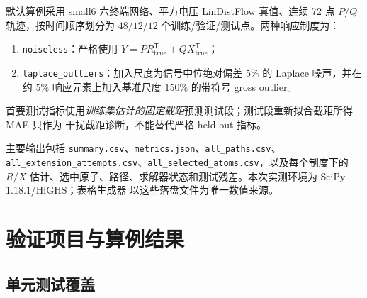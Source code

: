 \documentclass[UTF8,11pt]{ctexart}
\begin{document}
默认算例采用 small6 六终端网络、平方电压 LinDistFlow 真值、连续 72 点 $P/Q$ 轨迹，按时间顺序划分为
$48/12/12$ 个训练/验证/测试点。两种响应制度为：
\begin{enumerate}
  \item \texttt{noiseless}：严格使用 $Y=P R_{\mathrm{true}}^{\mathsf T}+QX_{\mathrm{true}}^{\mathsf T}$；
  \item \texttt{laplace\_outliers}：加入尺度为信号中位绝对偏差 $5\%$ 的 Laplace 噪声，并在约 $5\%$
  响应元素上加入基准尺度 $150\%$ 的带符号 gross outlier。
\end{enumerate}
首要测试指标使用\emph{训练集估计的固定截距}预测测试段；测试段重新拟合截距所得 MAE 只作为
干扰截距诊断，不能替代严格 held-out 指标。

主要输出包括 \texttt{summary.csv}、\texttt{metrics.json}、\texttt{all\_paths.csv}、
\texttt{all\_extension\_attempts.csv}、\texttt{all\_selected\_atoms.csv}，以及每个制度下的 $R/X$
估计、选中原子、路径、求解器状态和测试残差。本次实测环境为 SciPy 1.18.1/HiGHS；表格生成器
以这些落盘文件为唯一数值来源。

\section{验证项目与算例结果}

\subsection{单元测试覆盖}
\end{document}
